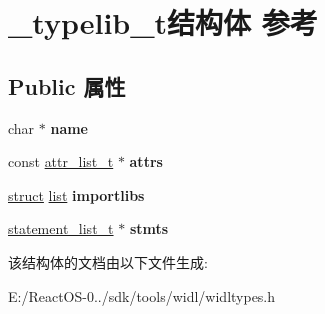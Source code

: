 \hypertarget{struct__typelib__t}{}\section{\+\_\+typelib\+\_\+t结构体 参考}
\label{struct__typelib__t}
\subsection*{Public 属性}
\begin{DoxyCompactItemize}
\item 
\mbox{\label{struct__typelib__t_ae08b40525a853b1e07dd1e4c044055a4}} 
char $\ast$ {\bfseries name}
\item 
\mbox{\label{struct__typelib__t_aa7b12aa278baf56e699158ef1e1ff2e7}} 
const \hyperlink{classlist}{attr\+\_\+list\+\_\+t} $\ast$ {\bfseries attrs}
\item 
\mbox{\label{struct__typelib__t_a5b5a53e209bb1f7c29f42292f4712d12}} 
\hyperlink{interfacestruct}{struct} \hyperlink{classlist}{list} {\bfseries importlibs}
\item 
\mbox{\label{struct__typelib__t_a59916b8b402a4e1e31209be76ce5231a}} 
\hyperlink{structstatement__list__t}{statement\+\_\+list\+\_\+t} $\ast$ {\bfseries stmts}
\end{DoxyCompactItemize}


该结构体的文档由以下文件生成\+:\begin{DoxyCompactItemize}
\item 
E\+:/\+React\+O\+S-\/0../sdk/tools/widl/widltypes.\+h\end{DoxyCompactItemize}
